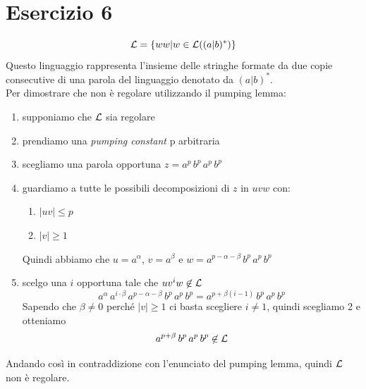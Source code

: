\documentclass[11pt]{article}
\begin{document}
\section*{Esercizio 6}
$${\cal L} = \{ww | w \in {\cal L}((a|b)^*)\}$$
Questo linguaggio rappresenta l'insieme delle stringhe formate da due
copie consecutive di una parola del linguaggio denotato da $(a|b)^*$.
\\Per dimostrare che non è regolare utilizzando il pumping lemma:
\begin{enumerate}
  \item supponiamo che $\cal L$ sia regolare
  \item prendiamo una \textit{pumping constant} p arbitraria
  \item scegliamo una parola opportuna $z=a^p\,b^p\,a^p\,b^p$
  \item guardiamo a tutte le possibili decomposizioni di $z$ in $uvw$ con:
  \begin{enumerate}
    \item $|uv| \le p$
    \item $|v| \ge 1$
  \end{enumerate}
  Quindi abbiamo che $u=a^\alpha$, $v=a^\beta$ e $w=a^{p -\alpha - \beta }\,b^p\,a^p\,b^p$
  \item scelgo una $i$ opportuna tale che $uv^iw \not \in \cal L$
  $$a^\alpha\,a^{i\cdot\beta}\,a^{p-\alpha -\beta}\,b^p\,a^p\,b^p = a^{p + \beta (i -1)}\,b^p\,a^p\,b^p$$
  Sapendo che $\beta \ne 0$ perché $|v| \ge 1$ ci basta scegliere $i \ne 1$, quindi scegliamo 2 e otteniamo 
  $$a^{p + \beta}\,b^p\,a^p\,b^p \not \in \cal L$$ 
\end{enumerate}
Andando così in contraddizione con l'enunciato del pumping lemma, quindi $\cal L$ non è regolare.
\newpage
\end{document}
